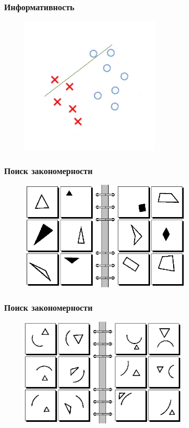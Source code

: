 \documentclass[12pt]{beamer}
\begin{document}
\begin{frame}\frametitle{Информативность}
\begin{figure}[htbp]
  \includegraphics[height=190pt, keepaspectratio = true]{images/dtree_4}   
\end{figure}
\end{frame}

\begin{frame}\frametitle{Поиск закономерности}
\begin{figure}[htbp]
  \includegraphics[height=150pt, keepaspectratio = true]{images/bongard6}   
\end{figure}
\end{frame}

\begin{frame}\frametitle{Поиск закономерности}
\begin{figure}[htbp]
  \includegraphics[height=150pt, keepaspectratio = true]{images/bongard40}   
\end{figure}
\end{frame}
\end{document}
